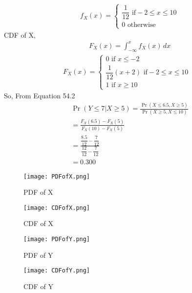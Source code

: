 \documentclass[journal,12pt,twocolumn]{IEEEtran}
\begin{document}
\begin{align}
\tag{54.3}
 &f_X(x)=\begin{cases}
  \dfrac{1}{12}  \text{  if} -2\leq x \leq10\\
    0 \text{  otherwise}
  \end{cases}
\end{align}
CDF of X,
\begin{align*}
    &F_X(x)=\int_{-\infty}^{x}f_X(x)\,dx
\end{align*}
\begin{align*}
  F_X(x)=\begin{cases}
  0  \text{ if } x\leq-2\\
  \dfrac{1}{12}(x+2) \text{ if} -2\leq x \leq 10\\
  1 \text{  if }  x \geq 10
  \end{cases}
\end{align*}
So,  From Equation 54.2
\begin{align*}
&\Pr(Y\leq7|X\geq5)=\frac{\Pr(X\leq6.5,X\geq5)}{\Pr(X\geq5,X\leq10)}\\
&=\frac{F_X(6.5)-F_X(5)}{F_X(10)-F_X(5)}\\
&=\frac{\dfrac{8.5}{12}-\dfrac{7}{12}}{\dfrac{12}{12}-\dfrac{7}{12}}\\
&=0.300
\end{align*}
\begin{figure}[h]
    \centering
    \texttt{[image: PDFofX.png]}
    \caption{PDF of X}
    \label{fig:my_label}
\end{figure}
\begin{figure}[h]
    \centering
    \texttt{[image: CDFofX.png]}
    \caption{CDF of X}
    \label{fig:my_label}
\end{figure}

\begin{figure}[h]
    \centering
    \texttt{[image: PDFofY.png]}
    \caption{PDF of Y}
    \label{fig:my_label}
\end{figure}

\begin{figure}[h]
    \centering
    \texttt{[image: CDFofY.png]}
    \caption{CDF of Y}
    \label{fig:my_label}
\end{figure}
\end{document}
